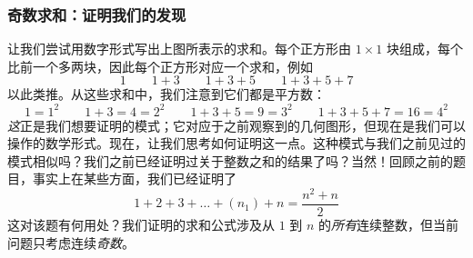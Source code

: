 \subsubsection*{奇数求和：证明我们的发现}

让我们尝试用数字形式写出上图所表示的求和。每个正方形由 $1 \times 1$ 块组成，每个比前一个多两块，因此每个正方形对应一个求和，例如
\[1 \qquad 1+3 \qquad 1+3+5 \qquad 1+3+5+7 \]
以此类推。从这些求和中，我们注意到它们都是平方数：
\[1=1^2 \qquad 1+3=4=2^2 \qquad 1+3+5=9=3^2 \qquad 1+3+5+7=16=4^2 \]
\emph{这}正是我们想要证明的模式；它对应于之前观察到的几何图形，但现在是我们可以操作的数学形式。现在，让我们思考如何证明这一点。这种模式与我们之前见过的模式相似吗？我们之前已经证明过关于整数之和的结果了吗？当然！回顾之前的题目，事实上在某些方面，我们已经证明了
\[1 + 2 + 3 + \dots + (n_1) + n =\frac{n^2 + n}{2}\]
这对该题有何用处？我们证明的求和公式涉及从 $1$ 到 $n$ 的\emph{所有}连续整数，但当前问题只考虑连续\emph{奇数}。

